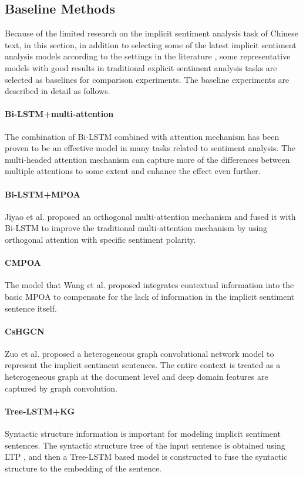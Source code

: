 \subsection{Baseline Methods}

Because of the limited research on the implicit sentiment analysis task of Chinese text, in this section, in addition to selecting some of the latest implicit sentiment analysis models according to the settings in the literature \cite{liao2022dynamic}, some representative models with good results in traditional explicit sentiment analysis tasks\cite{zhang2022incorporating} are selected as baselines for comparison experiments. The baseline experiments are described in detail as follows.

\paragraph{Bi-LSTM+multi-attention} 
The combination of Bi-LSTM combined with attention mechanism has been proven to be an effective model in many tasks related to sentiment analysis. The multi-headed attention mechanism can capture more of the differences between multiple attentions to some extent and enhance the effect even further.

\paragraph{Bi-LSTM+MPOA} 
\label{par:Bi-LSTM+MPOA}
Jiyao et al. \cite{wei2020BiLSTM} proposed an orthogonal multi-attention mechanism and fused it with Bi-LSTM to improve the traditional multi-attention mechanism by using orthogonal attention with specific sentiment polarity.

\paragraph{CMPOA} 
\label{par:CMPOA}
The model that Wang et al. \cite {WangSuGe2022} proposed integrates contextual information into the basic MPOA to compensate for the lack of information in the implicit sentiment sentence itself.


\paragraph{CsHGCN}
\label{par:CsHGCN}
Zuo et al. \cite{zuo2020context} proposed a heterogeneous graph convolutional network model to represent the implicit sentiment sentences. The entire context is treated as a heterogeneous graph at the document level and deep domain features are captured by graph convolution.

\paragraph{Tree-LSTM+KG} 
\label{par:Tree-LSTM+KG}
Syntactic structure information is important for modeling implicit sentiment sentences. The syntactic structure tree of the input sentence is obtained using LTP \cite{che2010ltp}, and then a Tree-LSTM \cite{tai2015improved} based model is constructed to fuse the syntactic structure to the embedding of the sentence.
